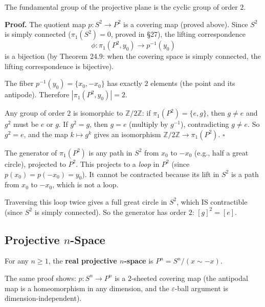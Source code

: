 \documentclass[11pt]{report}
\renewenvironment{proof}[1][Proof]{\noindent\textbf{#1.} }{\hfill$\square$\par\vspace{5pt}}
\begin{document}
\begin{thmbox}
The fundamental group of the projective plane is the cyclic group of order $2$.
\end{thmbox}

\begin{proof}
The quotient map $p: S^2 \to P^2$ is a covering map (proved above). Since $S^2$ is simply connected ($\pi_1(S^2) = 0$, proved in \S 27), the lifting correspondence
\[\phi: \pi_1(P^2, y_0) \to p^{-1}(y_0)\]
is a bijection (by Theorem 24.9: when the covering space is simply connected, the lifting correspondence is bijective).

The fiber $p^{-1}(y_0) = \{x_0, -x_0\}$ has exactly $2$ elements (the point and its antipode). Therefore $|\pi_1(P^2, y_0)| = 2$.

Any group of order $2$ is isomorphic to $\mathbb{Z}/2\mathbb{Z}$: if $\pi_1(P^2) = \{e, g\}$, then $g \neq e$ and $g^2$ must be $e$ or $g$. If $g^2 = g$, then $g = e$ (multiply by $g^{-1}$), contradicting $g \neq e$. So $g^2 = e$, and the map $k \mapsto g^k$ gives an isomorphism $\mathbb{Z}/2\mathbb{Z} \to \pi_1(P^2)$.
\end{proof}

\begin{rembox}
The generator of $\pi_1(P^2)$ is any path in $S^2$ from $x_0$ to $-x_0$ (e.g., half a great circle), projected to $P^2$. This projects to a \emph{loop} in $P^2$ (since $p(x_0) = p(-x_0) = y_0$). It cannot be contracted because its lift in $S^2$ is a path from $x_0$ to $-x_0$, which is not a loop.

Traversing this loop twice gives a full great circle in $S^2$, which IS contractible (since $S^2$ is simply connected). So the generator has order $2$: $[g]^2 = [e]$.
\end{rembox}

\subsection{Projective $n$-Space}

\begin{defbox}
For any $n \geq 1$, the \textbf{real projective $n$-space} is $P^n = S^n / (x \sim -x)$.
\end{defbox}

The same proof shows: $p: S^n \to P^n$ is a $2$-sheeted covering map (the antipodal map is a homeomorphism in any dimension, and the $\varepsilon$-ball argument is dimension-independent).
\end{document}
